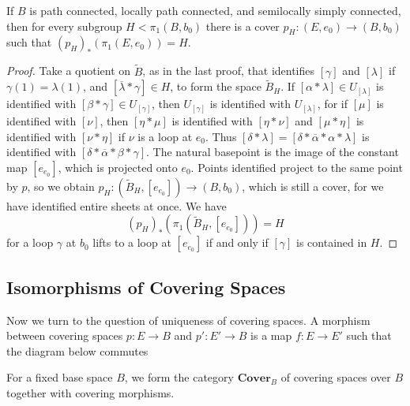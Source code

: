 \begin{theorem}
    If $B$ is path connected, locally path connected, and semilocally simply connected, then for every subgroup $H < \pi_1(B,b_0)$ there is a cover $p_H: (E,e_0) \to (B,b_0)$ such that $(p_H)_*(\pi_1(E,e_0)) = H$.
\end{theorem}
\begin{proof}
    Take a quotient on $\tilde{B}$, as in the last proof, that identifies $[\gamma]$ and $[\lambda]$ if $\gamma(1) = \lambda(1)$, and $[\overline{\lambda} * \gamma] \in H$, to form the space $\tilde{B}_H$. If $[\alpha * \lambda] \in U_{[\lambda]}$ is identified with $[\beta * \gamma] \in U_{[\gamma]}$, then $U_{[\gamma]}$ is identified with $U_{[\lambda]}$, for if $[\mu]$ is identified with $[\nu]$, then $[\eta * \mu]$ is identified with $[\eta * \nu]$ and $[\mu * \eta]$ is identified with $[\nu * \eta]$ if $\nu$ is a loop at $e_0$. Thus $[\delta * \lambda] = [\delta * \overline{\alpha} * \alpha * \lambda]$ is identified with $[\delta * \overline{\alpha} * \beta * \gamma]$. The natural basepoint is the image of the constant map $[e_{e_0}]$, which is projected onto $e_0$. Points identified project to the same point by $p$, so we obtain $p_H: (\tilde{B}_H, [e_{e_0}]) \to (B,b_0)$, which is still a cover, for we have identified entire sheets at once. We have
    \[ (p_H)_*(\pi_1(\tilde{B}_H, [e_{e_0}])) = H \]
    for a loop $\gamma$ at $b_0$ lifts to a loop at $[e_{e_0}]$ if and only if $[\gamma]$ is contained in $H$.
\end{proof}

\subsection{Isomorphisms of Covering Spaces}

Now we turn to the question of uniqueness of covering spaces. A morphism between covering spaces $p: E \to B$ and $p' : E' \to B$ is a map $f: E \to E'$ such that the diagram below commutes
%
\begin{center}
\end{center}
%
For a fixed base space $B$, we form the category $\textbf{Cover}_B$ of covering spaces over $B$ together with covering morphisms.

